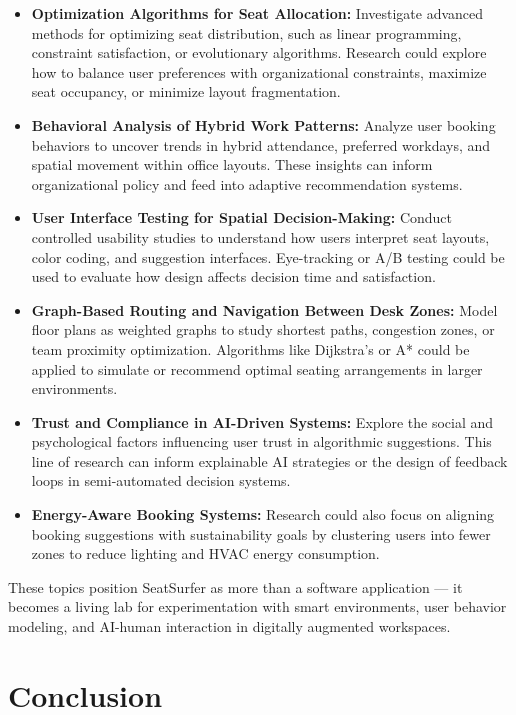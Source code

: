 \documentclass[12pt,a4paper]{report}
\begin{document}
\begin{itemize}
\item \textbf{Optimization Algorithms for Seat Allocation:}
Investigate advanced methods for optimizing seat distribution, such as linear programming, constraint satisfaction, or evolutionary algorithms. Research could explore how to balance user preferences with organizational constraints, maximize seat occupancy, or minimize layout fragmentation.
\item \textbf{Behavioral Analysis of Hybrid Work Patterns:}  
Analyze user booking behaviors to uncover trends in hybrid attendance, preferred workdays, and spatial movement within office layouts. These insights can inform organizational policy and feed into adaptive recommendation systems.
\item \textbf{User Interface Testing for Spatial Decision-Making:}  
Conduct controlled usability studies to understand how users interpret seat layouts, color coding, and suggestion interfaces. Eye-tracking or A/B testing could be used to evaluate how design affects decision time and satisfaction.
\item \textbf{Graph-Based Routing and Navigation Between Desk Zones:}  
Model floor plans as weighted graphs to study shortest paths, congestion zones, or team proximity optimization. Algorithms like Dijkstra's or A* could be applied to simulate or recommend optimal seating arrangements in larger environments.
\item \textbf{Trust and Compliance in AI-Driven Systems:}  
Explore the social and psychological factors influencing user trust in algorithmic suggestions. This line of research can inform explainable AI strategies or the design of feedback loops in semi-automated decision systems.
\item \textbf{Energy-Aware Booking Systems:}  
Research could also focus on aligning booking suggestions with sustainability goals by clustering users into fewer zones to reduce lighting and HVAC energy consumption.
\end{itemize}

These topics position SeatSurfer as more than a software application — it becomes a living lab for experimentation with smart environments, user behavior modeling, and AI-human interaction in digitally augmented workspaces.

\section{Conclusion}
\end{document}
